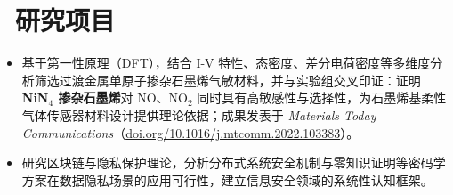 \documentclass{resume}
\begin{document}
\section{\texorpdfstring{\faFlask\ }{}研究项目}

\begin{itemize}
  \item 基于第一性原理（DFT），结合 I-V 特性、态密度、差分电荷密度等多维度分析筛选过渡金属单原子掺杂石墨烯气敏材料，并与实验组交叉印证：证明 \textbf{NiN$_4$ 掺杂石墨烯}对 NO、NO$_2$ 同时具有高敏感性与选择性，为石墨烯基柔性气体传感器材料设计提供理论依据；成果发表于 \textit{Materials Today Communications}（\href{https://doi.org/10.1016/j.mtcomm.2022.103383}{doi.org/10.1016/j.mtcomm.2022.103383}）。
\end{itemize}

\begin{itemize}
  \item 研究区块链与隐私保护理论，分析分布式系统安全机制与零知识证明等密码学方案在数据隐私场景的应用可行性，建立信息安全领域的系统性认知框架。
\end{itemize}
\end{document}
